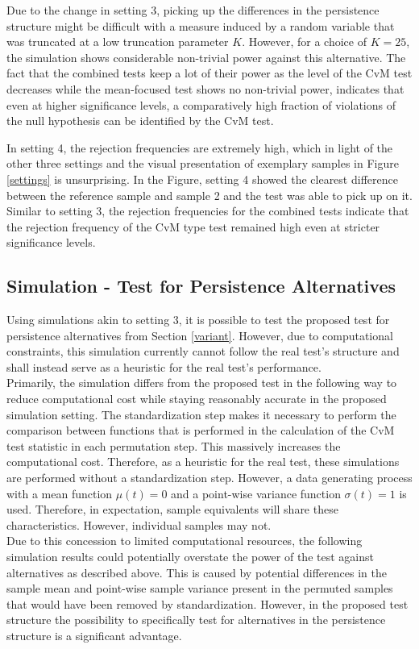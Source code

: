 \documentclass[12pt, a4paper]{article}
\theoremstyle{MAstyle} \newtheorem{assumption}{Assumption}[section]
\theoremstyle{MAstyle} \newtheorem{definition}{Definition}[section]
\theoremstyle{MAstyle} \newtheorem{theorem}{Theorem}[section]
\begin{document}
		Due to the change in setting 3, picking up the differences in the persistence structure might be difficult with a measure induced by a random variable that was truncated at a low truncation parameter $K$. However, for a choice of $K = 25$, the simulation shows considerable non-trivial power against this alternative. The fact that the combined tests keep a lot of their power as the level of the CvM test decreases while the mean-focused test shows no non-trivial power, indicates that even at higher significance levels, a comparatively high fraction of violations of the null hypothesis can be identified by the CvM test.
		
		In setting 4, the rejection frequencies are extremely high, which in light of the other three settings and the visual presentation of exemplary samples in Figure \ref{settings} is unsurprising. In the Figure, setting 4 showed the clearest difference between the reference sample and sample 2 and the test was able to pick up on it. Similar to setting 3, the rejection frequencies for the combined tests indicate that the rejection frequency of the CvM type test remained high even at stricter significance levels.
	
		\subsection{Simulation - Test for Persistence Alternatives}\label{sim_persistence}
		Using simulations akin to setting 3, it is possible to test the proposed test for persistence alternatives from Section \ref{variant}. However, due to computational constraints, this simulation currently cannot follow the real test's structure and shall instead serve as a heuristic for the real test's performance. \\
		Primarily, the simulation differs from the proposed test in the following way to reduce computational cost while staying reasonably accurate in the proposed simulation setting. The standardization step makes it necessary to perform the comparison between functions that is performed in the calculation of the CvM test statistic in each permutation step. This massively increases the computational cost. Therefore, as a heuristic for the real test, these simulations are performed without a standardization step. However, a data generating process with a mean function $\mu(t) = 0$ and a point-wise variance function $\sigma(t) = 1$ is used. Therefore, in expectation, sample equivalents will share these characteristics. However, individual samples may not. \\
		Due to this concession to limited computational resources, the following simulation results could potentially overstate the power of the test against alternatives as described above. This is caused by potential differences in the sample mean and point-wise sample variance present in the permuted samples that would have been removed by standardization. 
		However, in the proposed test structure the possibility to specifically test for alternatives in the persistence structure is a significant advantage.\\
	
\end{document}
